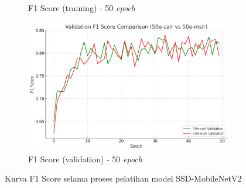 \begin{figure}[htbp]
\begin{subfigure}{0.45\textwidth}
    \caption{F1 Score (training) - 50 \emph{epoch}}
  \end{subfigure}
  \hfill
  \begin{subfigure}{0.45\textwidth}
    \includegraphics[width=\textwidth]{gambar/bab4-val-f1-score-50e.png}
    \caption{F1 Score (validation) - 50 \emph{epoch}}
  \end{subfigure}
  \caption{Kurva F1 Score selama proses pelatihan model SSD-MobileNetV2}
  \label{fig:f1_score_curves}
\end{figure}

